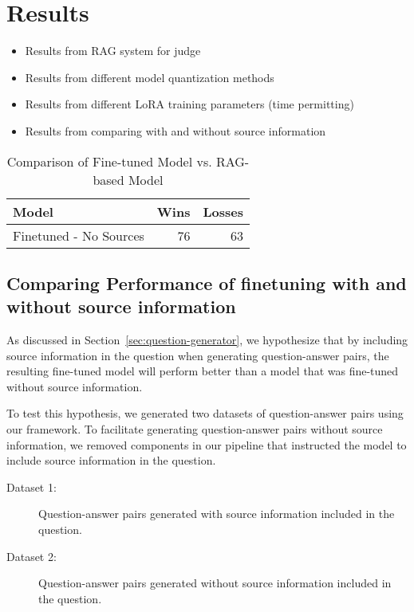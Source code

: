 \section{Results}\label{sec:results}

\begin{itemize}
    \item Results from RAG system for judge
    \item Results from different model quantization methods
    \item Results from different LoRA training parameters (time permitting)
    \item Results from comparing with and without source information
\end{itemize}

\begin{table}[h]
\centering
\caption{Comparison of Fine-tuned Model vs. RAG-based Model}
\begin{tabular}{lrr}
\hline
Model & Wins & Losses \\
\hline
Finetuned - No Sources & 76 & 63 \\
\hline
\end{tabular}
\label{tab:finetuned-vs-base}
\end{table}

\subsection{Comparing Performance of finetuning with and without source information}\label{sec:source-results}


As discussed in Section~\ref{sec:question-generator}, we hypothesize that by including source information 
in the question when generating question-answer pairs, the resulting fine-tuned model will perform 
better than a model that was fine-tuned without source information. 

To test this hypothesis, we generated two datasets of question-answer pairs using our framework. 
To facilitate generating question-answer pairs without source information, we removed components in our pipeline 
that instructed the model to include source information in the question.
\begin{description}
    \item[Dataset 1:] Question-answer pairs generated with source information included in the question.
    \item[Dataset 2:] Question-answer pairs generated without source information included in the question.
\end{description}

